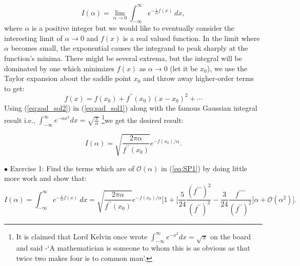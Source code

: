 \documentclass[11pt]{article}
\begin{document}
\begin{equation}
\label{eq:SP1} 
I(\alpha) = \lim_{\alpha \to 0} \int_{-\infty}^{\infty} e^{-\frac{1}{\alpha}f(x)} ~dx, 
\end{equation}
where $\alpha$ is a positive integer but we would like to eventually consider the interesting limit 
of $\alpha \to 0$ and $f(x)$ is a real valued function. In the limit where $\alpha$ becomes small, 
the exponential causes the integrand to peak sharply at the function's minima. There might be several extrema, but the integral will be dominated by one which minimizes $f(x)$ as $\alpha \to 0$ (let it be $x_{0}$), 
we use the Taylor expansion about the saddle point $x_{0}$ and throw away higher-order terms to get:
\begin{equation}
	\label{eq:sad_sol2}
	f(x) = f(x_{0}) + f^{\prime\prime}(x_{0}) (x-x_0)^{2} + \cdots 
\end{equation}
Using (\ref{eq:sad_sol2}) in (\ref{eq:sad_sol1}) along with the famous Gaussian integral result 
i.e., $\int_{-\infty}^{\infty} e^{-\alpha x^2} dx = \sqrt{\frac{\pi}{\alpha}}$
\footnote{It is claimed that Lord Kelvin once wrote $\int_{-\infty}^{\infty}e^{-x^2} dx = \sqrt{\pi}$ on the board 
and said -`A mathematician is someone to whom this is as obvious as that 
twice two makes four is to common man'.}we get the desired result:

\begin{equation}
	\label{eq:sad_sol1} 
	I(\alpha) =  \sqrt{\frac{2\pi \alpha}{f^{\prime\prime}(x_{0})}} e^{-f(x_{0})/\alpha}. 
\end{equation}



\begin{mdframed}[backgroundcolor=blue!3] 
	\textsc{} 
	$\bullet$ Exercise 1: Find the terms which are of $\mathcal{O}(\alpha)$ in (\ref{eq:SP1}) by doing little more work and show that:
	\begin{equation*}
	I(\alpha) = \int_{-\infty}^{\infty} e^{-\frac{1}{\alpha}f(x)} ~dx = \sqrt{\frac{2\pi \alpha}{f^{\prime\prime}(x_{0})}} e^{-f(x_{0})/\alpha} \Bigg[1 + 
	\Big[ \frac{5}{24} \frac{(f^{\prime\prime\prime})^2}{(f^{\prime\prime})^3} - \frac{3}{24} \frac{f^{\prime\prime\prime\prime}}{(f^{\prime\prime})^2}\Big] \alpha + \mathcal{O}(\alpha^{2})\Bigg]. 
	\end{equation*}	
\end{mdframed} 
\end{document}

